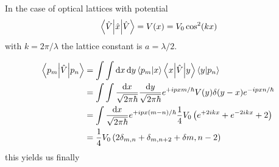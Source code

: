 In the case of optical lattices with potential
\begin{equation}
  \expval{\hat{x}}{\hat{V}}
  =V(x)
  =V_0\cos^2(kx)
  \label{eq:physics:pospotential}
\end{equation}
with $k=2\pi/\lambda$ the lattice constant is $a=\lambda/2$.

\begin{align*}
  \mel**{p_m}{\hat{V}}{p_n}
  &=
  \int\int\dd{x}\dd{y}\braket{p_m}{x}\mel**{x}{\hat{V}}{y}\braket{y}{p_n}\\
  &=
  \int\int\frac{\dd{x}}{\sqrt{2\pi\hbar}}\frac{\dd{y}}{\sqrt{2\pi\hbar}}
  e^{+ipxm/\hbar}V(y)\delta(y-x)e^{-ipxn/\hbar}\\
  &=
  \int\frac{\dd{x}}{\sqrt{2\pi\hbar}}
  e^{+ipx(m-n)/\hbar}\frac{1}{4}V_0\left(e^{+2ikx}+e^{-2ikx}+2\right)\\
  &=
  \frac{1}{4}V_0\left(2\delta_{m,n}+\delta_{m,n+2}+\delta{m,n-2}\right)
\end{align*}
this yields us finally
